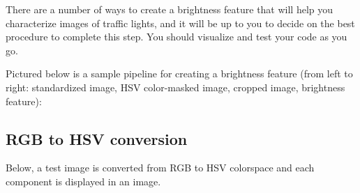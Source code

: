 \documentclass[11pt]{article}
\begin{document}
There are a number of ways to create a brightness feature that will help
you characterize images of traffic lights, and it will be up to you to
decide on the best procedure to complete this step. You should visualize
and test your code as you go.

Pictured below is a sample pipeline for creating a brightness feature
(from left to right: standardized image, HSV color-masked image, cropped
image, brightness feature):

    \hypertarget{rgb-to-hsv-conversion}{%
\subsection{RGB to HSV conversion}\label{rgb-to-hsv-conversion}}

Below, a test image is converted from RGB to HSV colorspace and each
component is displayed in an image.
\end{document}
